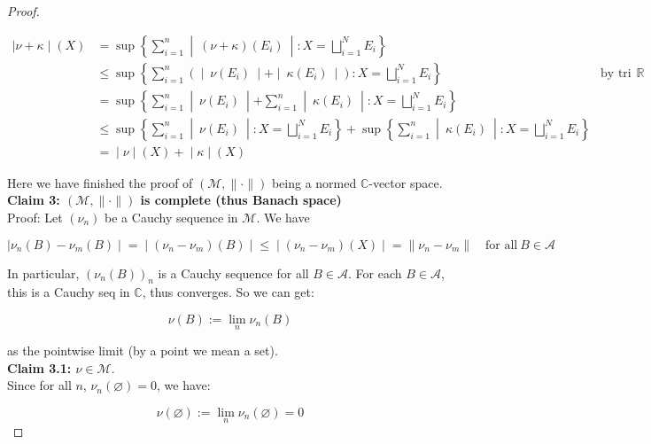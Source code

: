 \begin{proof}
\begin{itemize}
  \[\begin{matrix}
  \left. |\nu + \kappa \middle| (X) \right. & {= \sup\left\{ \sum\limits_{i = 1}^{n} \middle| \ (\nu + \kappa)(E_{i})\  \middle| :X = \bigsqcup\limits_{i = 1}^{N}E_{i} \right\}} & \\
   & {\leq \sup\left\{ \sum\limits_{i = 1}^{n}( \middle| \ \nu(E_{i})\  \middle| + \middle| \ \kappa(E_{i})\  \middle| ):X = \bigsqcup\limits_{i = 1}^{N}E_{i} \right\}\quad} & {\text{by tri ineq in}\ \mathbb{R}} \\
   & {= \sup\left\{ \sum\limits_{i = 1}^{n} \middle| \ \nu(E_{i})\  \middle| + \sum\limits_{i = 1}^{n} \middle| \ \kappa(E_{i})\  \middle| :X = \bigsqcup\limits_{i = 1}^{N}E_{i} \right\}} & \\
   & {\leq \sup\left\{ \sum\limits_{i = 1}^{n} \middle| \ \nu(E_{i})\  \middle| :X = \bigsqcup\limits_{i = 1}^{N}E_{i} \right\} + \sup\left\{ \sum\limits_{i = 1}^{n} \middle| \ \kappa(E_{i})\  \middle| :X = \bigsqcup\limits_{i = 1}^{N}E_{i} \right\}} & \\
   & \left. = \middle| \nu \middle| (X) + \middle| \kappa \middle| (X) \right. &
  \end{matrix}\]
\end{itemize}

Here we have finished the proof of \((\mathcal{M}, \parallel \cdot \parallel )\) being a normed \(\mathbb{C}\)-vector space.\\
\textbf{Claim 3: \((\mathcal{M}, \parallel \cdot \parallel )\) is complete (thus Banach space)}\\
Proof: Let \((\nu_{n})\) be a Cauchy sequence in \(\mathcal{M}\). We have

\[\left. |\nu_{n}(B) - \nu_{m}(B) \middle| = \middle| (\nu_{n} - \nu_{m})(B) \middle| \leq \middle| (\nu_{n} - \nu_{m})(X) \middle| = \parallel \nu_{n} - \nu_{m} \parallel \quad\text{for all}\ B \in \mathcal{A} \right.\]

In particular, \((\nu_{n}(B))_{n}\) is a Cauchy sequence for all \(B \in \mathcal{A}\). For each \(B \in \mathcal{A}\), this is a Cauchy seq in \(\mathbb{C}\), thus converges. So we can get:

\[\nu(B) := \lim\limits_{n}\nu_{n}(B)\]

as the pointwise limit (by a point we mean a set).\\
\textbf{Claim 3.1: \(\nu \in \mathcal{M}\)}.\\
Since for all \(n\), \(\nu_{n}(\varnothing) = 0\), we have:

\[\nu(\varnothing) := \lim\limits_{n}\nu_{n}(\varnothing) = 0\]


\end{proof}
